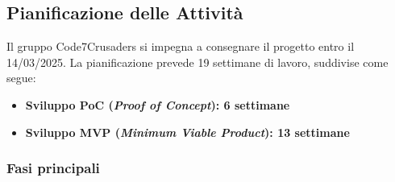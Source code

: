 \documentclass{article}
\begin{document}
    \subsection{Pianificazione delle Attività}
        Il gruppo Code7Crusaders 
        si impegna a consegnare il progetto entro il 14/03/2025. La pianificazione prevede 
        19 settimane di lavoro, suddivise come segue:
        \begin{itemize}
            \item \textbf{Sviluppo PoC (\textit{Proof of Concept}): 6 settimane}
            \item \textbf{Sviluppo MVP (\textit{Minimum Viable Product}): 13 settimane}
        \end{itemize}

        \subsubsection{Fasi principali}  %
\end{document}
